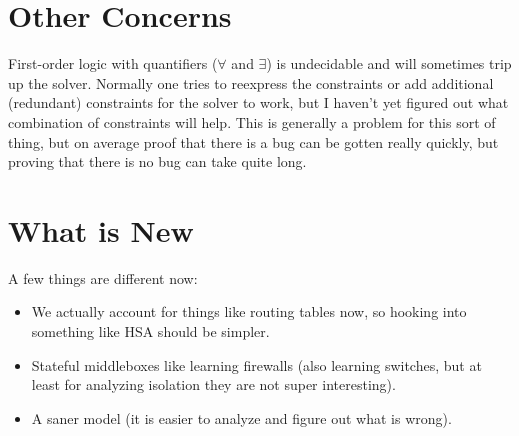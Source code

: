 \documentclass[11pt]{article}
\begin{document}
{\section{Other Concerns}
First-order logic with quantifiers ($\forall$ and $\exists$) is
undecidable and will sometimes trip up the solver. Normally one tries to reexpress the constraints or add additional
(redundant) constraints for the solver to work, but I haven't yet figured out what combination of constraints will help.
This is generally a problem for this sort of thing, but on average proof that there is a bug can be gotten really
quickly, but proving that there is no bug can take quite long.

\section{What is New}
A few things are different now:
\begin{itemize}
\item We actually account for things like routing tables now, so hooking into something like HSA should be simpler.
\item Stateful middleboxes like learning firewalls (also learning switches, but at least for analyzing isolation they are
not super interesting).
\item A saner model (it is easier to analyze and figure out what is wrong).
\end{itemize}

}
\end{document}
